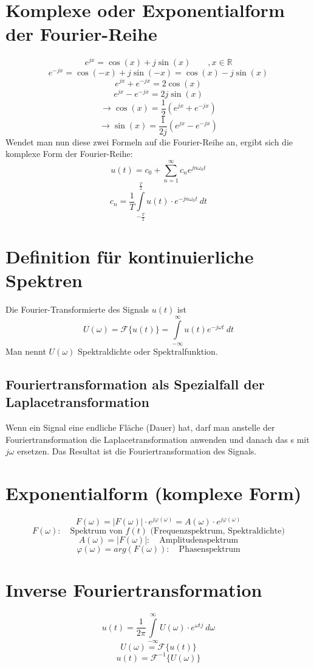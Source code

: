 \section{Komplexe oder Exponentialform der Fourier-Reihe}
\[ e^{j x} = \cos(x) + j \sin(x) \qquad , x \in \mathbb{R} \]
\[ e^{- j x} = \cos(-x) + j \sin(-x) = \cos(x) - j \sin(x) \]
\[ e^{jx} + e^{-jx} = 2 \cos(x) \]
\[ e^{jx} - e^{-jx} = 2 j \sin(x) \]
\[ \to \cos(x) = \frac{1}{2} (e^{jx} + e^{-jx}) \]
\[ \to \sin(x) = \frac{1}{2j} (e^{jx} - e^{-jx}) \]
Wendet man nun diese zwei Formeln auf die Fourier-Reihe an, ergibt sich die komplexe Form der Fourier-Reihe:
\[ u(t) = c_0 + \sum\limits_{n = 1}^{\infty} c_n e^{j n \omega_0 t} \]
\[ c_n = \frac{1}{T} \int\limits_{-\frac{T}{2}}^{\frac{T}{2}} 
u(t) \cdot e^{-j n \omega_0 t} ~ dt \]



\section{Definition für kontinuierliche Spektren}
 Die Fourier-Transformierte des Signals $u(t)$ ist 
\[ U(\omega) = \mathcal{F}\{ u(t) \} = \int\limits_{-\infty}^{\infty} 
u(t) e^{-j \omega t} ~dt \]
Man nennt $U(\omega)$ Spektraldichte oder Spektralfunktion.\\

\subsection{Fouriertransformation als Spezialfall der Laplacetransformation}
Wenn ein Signal eine endliche Fläche (Dauer) hat, darf man anstelle der Fouriertransformation
die Laplacetransformation anwenden und danach das s mit $j\omega$ ersetzen. Das Resultat ist die Fouriertransformation des Signals.

\section{Exponentialform (komplexe Form)}
\[ \boxed{F(\omega) = |F(\omega)| \cdot e^{j\varphi(\omega)} = A(\omega) \cdot e^{j\varphi(\omega)}}   \]
\[ F(\omega): \quad \text{Spektrum von $f(t)$ (Frequenzspektrum, Spektraldichte)} \]
\[ A(\omega) = |F(\omega)|: \quad \text{Amplitudenspektrum} \]
\[ \varphi (\omega) = arg(F(\omega)): \quad \text{Phasenspektrum} \]

\section{Inverse Fouriertransformation}
\[ u(t) = \frac{1}{2 \pi}  \int\limits_{-\infty}^{\infty} U(\omega) \cdot e^{\omega t j} ~ d\omega \]
\[ U(\omega) = \mathcal{F} \{ u(t) \} \]
\[ u(t) = \mathcal{F}^{-1} \{ U(\omega) \} \]

